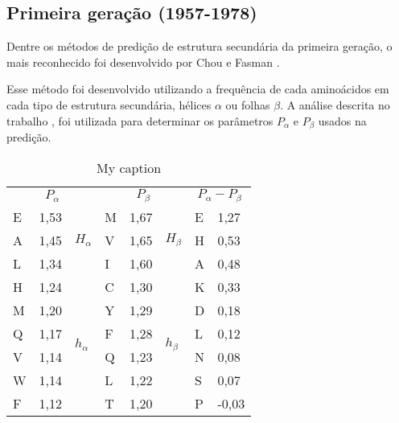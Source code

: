 \subsection{Primeira geração (1957-1978)} 

Dentre os métodos de predição de estrutura secundária da primeira geração, o mais reconhecido foi desenvolvido por Chou e Fasman \citeyear{key}. 

Esse método foi desenvolvido utilizando a frequência de cada aminoácidos em cada tipo de estrutura secundária, hélices $\alpha$ ou folhas $\beta$. A análise descrita no trabalho \cite{key}, foi utilizada para determinar os parâmetros $P_\alpha$ e $P_\beta$ usados na predição.


\begin{table}[]
    \centering
    \caption{My caption}
    \label{my-label}
    \begin{tabular}{@{}llllllll@{}}
    \toprule
    \multicolumn{3}{c}{$P_\alpha$}         & \multicolumn{3}{c}{$P_\beta$}         & \multicolumn{2}{c}{$P_\alpha - P_\beta$} \\ 
    \cmidrule(r){1-3} \cmidrule(r){4-6} \cmidrule(r){7-8}
    E & 1,53 & \multirow{3}{*}{$H_\alpha$} & M & 1,67 & \multirow{3}{*}{$H_\beta$} & E                 & 1,27                 \\
    A & 1,45 &                             & V & 1,65 &                            & H                 & 0,53                 \\
    L & 1,34 &                             & I & 1,60 &                            & A                 & 0,48                 \\
    \cmidrule(r){1-3} \cmidrule(r){4-6}
    H & 1,24 & \multirow{6}{*}{$h_\alpha$} & C & 1,30 & \multirow{7}{*}{$h_\beta$} & K                 & 0,33                 \\
    M & 1,20 &                             & Y & 1,29 &                            & D                 & 0,18                 \\
    Q & 1,17 &                             & F & 1,28 &                            & L                 & 0,12                 \\
    V & 1,14 &                             & Q & 1,23 &                            & N                 & 0,08                 \\
    W & 1,14 &                             & L & 1,22 &                            & S                 & 0,07                 \\
    F & 1,12 &                             & T & 1,20 &                            & P                 & -0,03                \\

\end{tabular}
\end{table}
